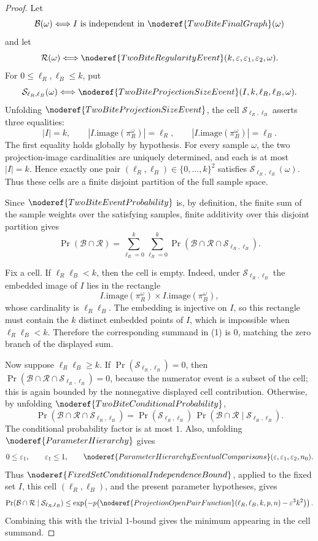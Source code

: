 \begin{proof}
Let
\[
\mathcal B(\omega)\Longleftrightarrow
I\text{ is independent in }\noderef{TwoBiteFinalGraph}(\omega)
\]
and let
\[
\mathcal R(\omega)\Longleftrightarrow
\noderef{TwoBiteRegularityEvent}(k,\varepsilon,\varepsilon_1,\varepsilon_2,\omega).
\]
For \(0\le \ell_R,\ell_B\le k\), put
\[
\mathcal S_{\ell_R,\ell_B}(\omega)\Longleftrightarrow
\noderef{TwoBiteProjectionSizeEvent}(I,k,\ell_R,\ell_B,\omega).
\]
Unfolding \(\noderef{TwoBiteProjectionSizeEvent}\), the cell
\(\mathcal S_{\ell_R,\ell_B}\) asserts three equalities:
\[
|I|=k,\qquad |I.\mathrm{image}(\pi_R^\omega)|=\ell_R,\qquad
|I.\mathrm{image}(\pi_B^\omega)|=\ell_B.
\]
The first equality holds globally by hypothesis.  For every sample
\(\omega\), the two projection-image cardinalities are uniquely determined,
and each is at most \(|I|=k\).  Hence exactly one pair
\((\ell_R,\ell_B)\in\{0,\ldots,k\}^2\) satisfies
\(\mathcal S_{\ell_R,\ell_B}(\omega)\).  Thus these cells are a finite
disjoint partition of the full sample space.

Since \(\noderef{TwoBiteEventProbability}\) is, by definition, the finite sum
of the sample weights over the satisfying samples, finite additivity over this
disjoint partition gives
\[
\Pr(\mathcal B\cap\mathcal R)
=
\sum_{\ell_R=0}^{k}\sum_{\ell_B=0}^{k}
\Pr(\mathcal B\cap\mathcal R\cap\mathcal S_{\ell_R,\ell_B}). \tag{1}
\]

Fix a cell.  If \(\ell_R\ell_B<k\), then the cell is empty.  Indeed, under
\(\mathcal S_{\ell_R,\ell_B}\) the embedded image of \(I\) lies in the
rectangle
\[
I.\mathrm{image}(\pi_R^\omega)\times I.\mathrm{image}(\pi_B^\omega),
\]
whose cardinality is \(\ell_R\ell_B\).  The embedding is injective on \(I\),
so this rectangle must contain the \(k\) distinct embedded points of \(I\),
which is impossible when \(\ell_R\ell_B<k\).  Therefore the corresponding
summand in (1) is \(0\), matching the zero branch of the displayed sum.

Now suppose \(\ell_R\ell_B\ge k\).  If
\(\Pr(\mathcal S_{\ell_R,\ell_B})=0\), then
\(\Pr(\mathcal B\cap\mathcal R\cap\mathcal S_{\ell_R,\ell_B})=0\), because
the numerator event is a subset of the cell; this is again bounded by the
nonnegative displayed cell contribution.  Otherwise, by unfolding
\(\noderef{TwoBiteConditionalProbability}\),
\[
\Pr(\mathcal B\cap\mathcal R\cap\mathcal S_{\ell_R,\ell_B})
=
\Pr(\mathcal S_{\ell_R,\ell_B})\,
\Pr(\mathcal B\cap\mathcal R\mid \mathcal S_{\ell_R,\ell_B}). \tag{2}
\]
The conditional probability factor is at most \(1\).  Also, unfolding
\(\noderef{ParameterHierarchy}\) gives
\[
0\le\varepsilon_1,\qquad \varepsilon_1\le1,\qquad
\noderef{ParameterHierarchyEventualComparisons}
(\varepsilon,\varepsilon_1,\varepsilon_2,n_0).
\]
Thus \(\noderef{FixedSetConditionalIndependenceBound}\), applied to the fixed
set \(I\), this cell \((\ell_R,\ell_B)\), and the present parameter
hypotheses, gives
\[
\Pr(\mathcal B\cap\mathcal R\mid \mathcal S_{\ell_R,\ell_B})
\le
\exp\!\left(-p\bigl(
\noderef{ProjectionOpenPairFunction}(\ell_R,\ell_B,k,p,n)
-\varepsilon^3k^2\bigr)\right).
\]
Combining this with the trivial \(1\)-bound gives the minimum appearing in the
cell summand.


\end{proof}
